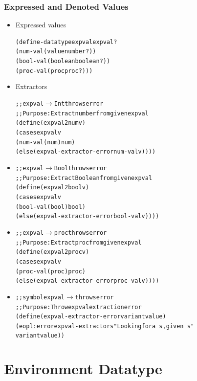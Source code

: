 \documentclass{beamer}
\newcommand{\arrow}{\(\rightarrow\)}
\newcommand{\quot}{\texttt{\textquotesingle{}}}
\begin{document}
\begin{frame}[fragile]
\frametitle{Expressed and Denoted Values}
\begin{tiny}
\begin{itemize}
\item<1-> Expressed values
\begin{alltt}
(define-datatype expval expval?
  (num-val (value number?))
  (bool-val (boolean boolean?))
  (proc-val (proc proc?)))
\end{alltt}

\item<2-> Extractors
\begin{alltt}
;; expval \arrow{} Int throws error
;; Purpose: Extract number from given expval
(define (expval2num v)
  (cases expval v
    (num-val (num) num)
    (else (expval-extractor-error \quot{}num-val v))))
\end{alltt}

\item<3->
\begin{alltt}
;; expval \arrow{} Bool throws error
;; Purpose: Extract Boolean from given expval
(define (expval2bool v)
  (cases expval v
    (bool-val (bool) bool)
    (else (expval-extractor-error \quot{}bool-val v))))
\end{alltt}

\item<4->
\begin{alltt}
;; expval \arrow{} proc throws error
;; Purpose: Extract proc from given expval
(define (expval2proc v)
  (cases expval v
    (proc-val (proc) proc)
    (else (expval-extractor-error \quot{}proc-val v))))
\end{alltt}

\item<5->
\begin{alltt}
;; symbol expval \arrow{} throws error
;; Purpose: Throw expval extraction error
(define (expval-extractor-error variant value)
  (eopl:error \quot{}expval-extractors "Looking for a ~s, given ~s"
              variant value))
\end{alltt}

\end{itemize}
\end{tiny}
\end{frame}

\section{Environment Datatype}
\end{document}
